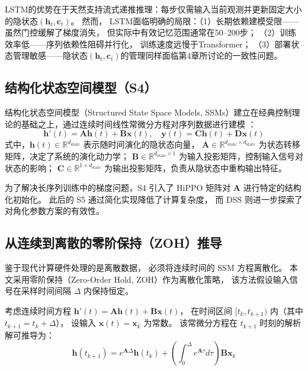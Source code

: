 LSTM的优势在于天然支持流式递推推理：每步仅需输入当前观测并更新固定大小的隐状态$(\mathbf{h}_t, \mathbf{c}_t)$。
然而，
LSTM面临明确的局限：（1）长期依赖建模受限——虽然门控缓解了梯度消失，
但实际中有效记忆范围通常在50--200步\cite{Hochreiter1997LSTM}；
（2）训练效率低——序列依赖性阻碍并行化，
训练速度远慢于Transformer；
（3）部署状态管理敏感——隐状态$(\mathbf{h}_t, \mathbf{c}_t)$的管理同样面临第4章所讨论的一致性问题。

\subsection{结构化状态空间模型（S4）}

结构化状态空间模型（Structured State Space Models, SSMs）建立在经典控制理论的基础之上，通过连续时间线性常微分方程对序列数据进行建模 \cite{Gu2022S4}：
\begin{equation}
  \mathbf{h}'(t) = \mathbf{A}\mathbf{h}(t) + \mathbf{B}\mathbf{x}(t), \quad \mathbf{y}(t) = \mathbf{C}\mathbf{h}(t) + \mathbf{D}\mathbf{x}(t)
  \label{eq:ssm}
\end{equation}
式中，$\mathbf{h}(t) \in \mathbb{R}^{d_{\text{state}}}$ 表示随时间演化的隐状态向量，
$\mathbf{A} \in \mathbb{R}^{d_{\text{state}} \times d_{\text{state}}}$ 为状态转移矩阵，决定了系统的演化动力学；
$\mathbf{B} \in \mathbb{R}^{d_{\text{state}} \times 1}$ 为输入投影矩阵，控制输入信号对状态的影响；
$\mathbf{C} \in \mathbb{R}^{1 \times d_{\text{state}}}$ 为输出投影矩阵，负责从隐状态中重构输出特征。

为了解决长序列训练中的梯度问题，S4 \cite{Gu2022S4} 引入了 HiPPO \cite{Gu2020HiPPO} 矩阵对 $\mathbf{A}$ 进行特定的结构化初始化。
此后的 S5 \cite{Smith2023S5} 通过简化实现降低了计算复杂度，
而 DSS \cite{Gu2022DSS} 则进一步探索了对角化参数方案的有效性。

\subsection{从连续到离散的零阶保持（ZOH）推导}

鉴于现代计算硬件处理的是离散数据，
必须将连续时间的 SSM 方程离散化。
本文采用零阶保持（Zero-Order Hold, ZOH）作为离散化策略，
该方法假设输入信号在采样时间间隔 $\Delta$ 内保持恒定。

考虑连续时间方程 $\mathbf{h}'(t) = \mathbf{A}\mathbf{h}(t) + \mathbf{B}\mathbf{x}(t)$，
在时间区间 $[t_k, t_{k+1})$ 内（其中 $t_{k+1} = t_k + \Delta$），
设输入 $\mathbf{x}(t) = \mathbf{x}_k$ 为常数。
该常微分方程在 $t_{k+1}$ 时刻的解析解可推导为：
\begin{equation}
  \mathbf{h}(t_{k+1}) = e^{\mathbf{A}\Delta} \mathbf{h}(t_k) + \left(\int_0^{\Delta} e^{\mathbf{A}\tau} d\tau \right) \mathbf{B} \mathbf{x}_k
\end{equation}

